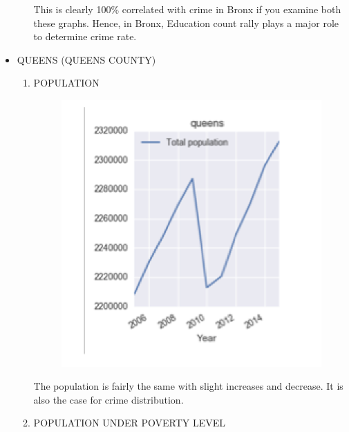 \documentclass{article}
\begin{document}
\begin{itemize}
\begin{enumerate}[label=(\alph*)]
This is clearly 100\% correlated with crime in Bronx if you examine both these graphs. Hence, in Bronx, Education count rally plays a major role to determine crime rate.
\end{enumerate}

\item QUEENS (QUEENS COUNTY)

\begin{enumerate}[label=(\alph*)]

\item POPULATION

\begin{figure}[H]
\centering
\includegraphics[scale=1]{QueensPopulation.png}
\end{figure}

The population is fairly the same with slight increases and decrease. It is also the case for crime distribution.

\item POPULATION UNDER POVERTY LEVEL


\end{enumerate}
\end{itemize}
\end{document}
